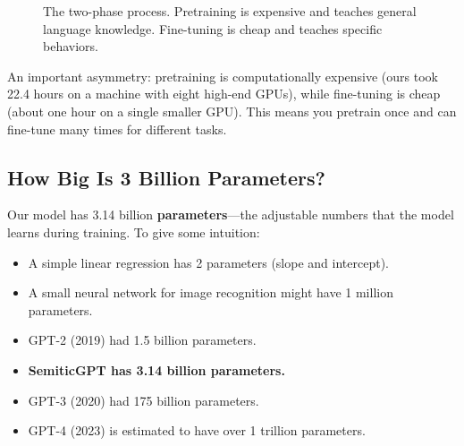 \documentclass[11pt,a4paper]{article}
\begin{document}
\begin{figure}[H]
\centering
{}
\caption{The two-phase process. Pretraining is expensive and teaches general language knowledge. Fine-tuning is cheap and teaches specific behaviors.}
\label{fig:two_phases}
\end{figure}

An important asymmetry: pretraining is computationally expensive (ours took 22.4 hours on a machine with eight high-end GPUs), while fine-tuning is cheap (about one hour on a single smaller GPU). This means you pretrain once and can fine-tune many times for different tasks.

\subsection{How Big Is 3 Billion Parameters?}

Our model has 3.14 billion \textbf{parameters}---the adjustable numbers that the model learns during training. To give some intuition:

\begin{itemize}
    \item A simple linear regression has 2 parameters (slope and intercept).
    \item A small neural network for image recognition might have 1 million parameters.
    \item GPT-2 (2019) had 1.5 billion parameters.
    \item \textbf{SemiticGPT has 3.14 billion parameters.}
    \item GPT-3 (2020) had 175 billion parameters.
    \item GPT-4 (2023) is estimated to have over 1 trillion parameters.
\end{itemize}
\end{document}
